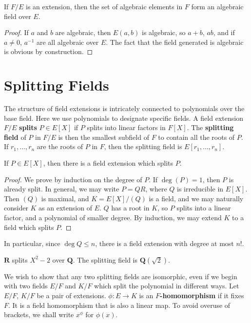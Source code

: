 \begin{theorem}
    If $F/E$ is an extension, then the set of algebraic elements in $F$ form an algebraic field over $E$.
\end{theorem}
\begin{proof}
    If $a$ and $b$ are algebraic, then $E(a,b)$ is algebraic, so $a + b$, $ab$, and if $a \neq 0$, $a^{-1}$ are all algebraic over $E$. The fact that the field generated is algebraic is obvious by construction.
\end{proof}

\section{Splitting Fields}

The structure of field extensions is intricately connected to polynomials over the base field. Here we use polynomials to designate specific fields. A field extension $F/E$ {\bf splits} $P \in E[X]$ if $P$ splits into linear factors in $F[X]$. The {\bf splitting field} of $P$ in $F/E$ is then the smallest subfield of $F$ to contain all the roots of $P$. If $r_1, \dots, r_n$ are the roots of $P$ in $F$, then the splitting field is $E[r_1, \dots, r_n]$.

\begin{theorem}
    If $P \in E[X]$, then there is a field extension which splits $P$.
\end{theorem}
\begin{proof}
    We prove by induction on the degree of $P$. If $\deg(P) = 1$, then $P$ is already split. In general, we may write $P = QR$, where $Q$ is irreducible in $E[X]$. Then $(Q)$ is maximal, and $K = E[X]/(Q)$ is a field, and we may naturally consider $K$ as an extension of $E$. $Q$ has a root in $K$, so $P$ splits into a linear factor, and a polynomial of smaller degree. By induction, we may extend $K$ to a field which splits $P$.
\end{proof}

In particular, since $\deg Q \leq n$, there is a field extension with degree at most $n!$.

\begin{example}
    $\mathbf{R}$ splits $X^2 - 2$ over $\mathbf{Q}$. The splitting field is $\mathbf{Q}(\sqrt{2})$.
\end{example}

We wish to show that any two splitting fields are isomorphic, even if we begin with two fields $E/F$ and $K/F$ which split the polynomial in different ways. Let $E/F$, $K/F$ be a pair of extensions. $\phi:E \to K$ is an {\bf $F$-homomorphism} if it fixes $F$. It is a field homomorphism that is also a linear map. To avoid overuse of brackets, we shall write $x^\phi$ for $\phi(x)$.

